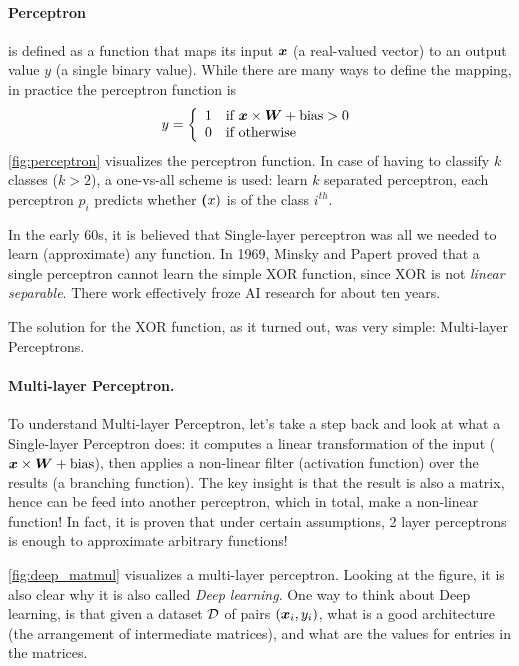 \paragraph{Perceptron} is defined as a function that maps its input $\boldsymbol{x}$
(a real-valued vector) to an output value $y$ (a single binary value). While
there are many ways to define the mapping, in practice the perceptron function is
\begin{align*}
  y =  \left\{ \begin{array}{ll}  1  & \mbox{if } \boldsymbol{x} \times \boldsymbol{W} + \text{bias} > 0 \\  0  & \mbox{if } \text{otherwise} \end{array} \right.
\end{align*}
\cref{fig:perceptron} visualizes the perceptron function. In case of having to
classify $k$ classes ($k>2$), a one-vs-all scheme is used: learn $k$ separated
perceptron, each perceptron $p_i$ predicts whether $\boldsymbol{(}x)$ is of the class
$i^{th}$.

In the early 60s, it is believed that Single-layer perceptron was all we needed to learn
(approximate) any function. In 1969, Minsky and Papert \cite{perceptrons} proved
that a single perceptron cannot learn the simple XOR function, since XOR is not
\emph{linear separable}. There work effectively froze AI research for about ten years.

The solution for the XOR function, as it turned out, was very simple:
Multi-layer Perceptrons.

\paragraph{Multi-layer Perceptron.} To understand Multi-layer Perceptron, let's
take a step back and look at what a Single-layer Perceptron does: it computes a linear
transformation of the input ($\boldsymbol{x} \times \boldsymbol{W} + \text{bias}$), then
applies a non-linear filter (activation function) over the results (a branching function). The key
insight is that the result is also a matrix, hence can be feed into another
perceptron, which in total, make a non-linear function! In fact, it is proven \cite{universal}
that under certain assumptions, 2 layer perceptrons is enough to approximate arbitrary
functions!

\cref{fig:deep_matmul} visualizes a multi-layer perceptron. Looking at the
figure, it is also clear why it is also called \emph{Deep learning}. One way to
think about Deep learning, is that given a dataset $\mathcal{D}$ of pairs $(\boldsymbol{x}_i, y_i)$, what
is a good architecture (the arrangement of intermediate matrices), and what are
the values for entries in the matrices.

